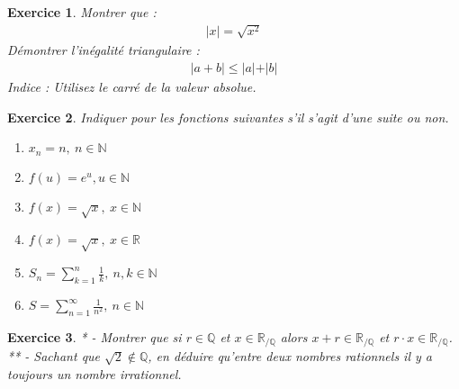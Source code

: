 \documentclass[11pt,french,table]{article}
\theoremstyle{exercice}
\newtheorem{exercice}{Exercice}
\begin{document}
\vspace{1em}
\begin{exercice}
 Montrer que : 
\begin{align*}
    \lvert x \lvert = \sqrt{x^2}
\end{align*}
Démontrer l'inégalité triangulaire : 
\begin{align*}
    \lvert a+b \lvert \leq \lvert a \lvert +\lvert b\lvert 
\end{align*}
\textit{Indice : Utilisez le carré de la valeur absolue. } \\
\end{exercice}
\vspace{1em}
\begin{exercice}
 Indiquer pour les fonctions suivantes s'il s'agit d'une suite ou non. 
\begin{multicols}{2}
\begin{enumerate}
    \item [(a)] $x_n=n, \ n \in \mathbb{N}$
    \item [(b)] $f(u)=e^u, u \in \mathbb{N}$
    \item [(c)] $f(x)=\sqrt{x}, \ x \in \mathbb{N}$
    \columnbreak
     \item [(d)] $f(x)=\sqrt{x}, \ x \in \mathbb{R}$
      \item [(e)] $S_n=\sum_{k=1}^{n} \frac{1}{k}, \ n,k \in \mathbb{N}$
      \item [(f)] $S=\sum_{n=1}^{\infty} \frac{1}{n^2}, \ n \in \mathbb{N}$
\end{enumerate}
\end{multicols}
\end{exercice}
\vspace{1em}
\begin{exercice}
 * - Montrer que si $r\in \mathbb{Q}$ et $x\in \mathbb{R}_{ / \mathbb{Q}}$ alors $x+r\in \mathbb{R}_{ / \mathbb{Q}}$ et $r\cdot x\in \mathbb{R}_{ / \mathbb{Q}}$.\\
** - Sachant que $\sqrt{2}\notin \mathbb{Q}$, en déduire  qu'entre deux nombres rationnels il y a toujours un nombre irrationnel.
\end{exercice}
\vspace{1em}
\end{document}
